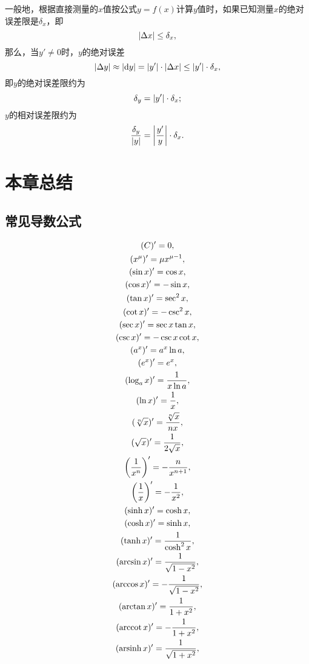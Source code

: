 一般地，根据直接测量的\(x\)值按公式\(y = f(x)\)计算\(y\)值时，如果已知测量\(x\)的绝对误差限是\(\delta_x\)，即\[
\abs{\Delta x} \leq \delta_x,
\]那么，当\(y' \neq 0\)时，\(y\)的绝对误差\[
\abs{\Delta y} \approx \abs{\dd{y}} = \abs{y'} \cdot \abs{\Delta x} \leq \abs{y'} \cdot \delta_x,
\]即\(y\)的绝对误差限约为\[
\delta_y = \abs{y'} \cdot \delta_x;
\]\(y\)的相对误差限约为\[
\frac{\delta_y}{\abs{y}} = \abs{\frac{y'}{y}} \cdot \delta_x.
\]

\section{本章总结}
\subsection{常见导数公式}
\begin{gather*}
(C)' = 0, \\
(x^\mu)' = \mu x^{\mu-1}, \\
(\sin x)' = \cos x, \\
(\cos x)' = - \sin x, \\
(\tan x)' = \sec^2 x, \\
(\cot x)' = - \csc^2 x, \\
(\sec x)' = \sec x \tan x, \\
(\csc x)' = - \csc x \cot x, \\
(a^x)' = a^x \ln a, \\
(e^x)' = e^x, \\
(\log_a x)' = \frac{1}{x \ln a}, \\
(\ln x)' = \frac{1}{x}, \\
(\sqrt[n]{x})' = \frac{\sqrt[n]{x}}{n x}, \\
(\sqrt{x})' = \frac{1}{2\sqrt{x}}, \\
\left(\frac{1}{x^n}\right)' = -\frac{n}{x^{n+1}}, \\
\left(\frac{1}{x}\right)' = -\frac{1}{x^2}, \\
(\sinh x)' = \cosh x, \\
(\cosh x)' = \sinh x, \\
(\tanh x)' = \frac{1}{\cosh^2 x}, \\
(\arcsin x)' = \frac{1}{\sqrt{1 - x^2}}, \\
(\arccos x)' = - \frac{1}{\sqrt{1 - x^2}}, \\
(\arctan x)' = \frac{1}{1 + x^2}, \\
(\arccot x)' = - \frac{1}{1 + x^2}, \\
(\arsinh x)' = \frac{1}{\sqrt{1 + x^2}}, \\

\end{gather*}
